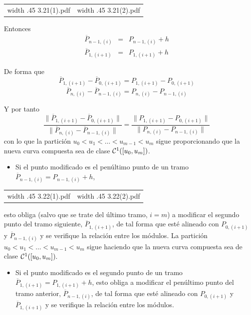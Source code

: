 \documentclass[twoside]{report}
\newcommand{\colocapdf}[2]{\quad\pdfimage width #2 {#1.pdf}}
\begin{document}
\begin{center}
\begin{tabular}{cc}
\colocapdf{3.21(1)}{.45\textwidth} &
\colocapdf{3.21(2)}{.45\textwidth}
\end{tabular}
\end{center}


Entonces $$\begin{array}{rcl} \overline{P}_{n-1, (i)}&=&P_{n-1, (i)}+h\\ \overline{P}_{1, (i+1)}&=&P_{1, (i+1)}+h \end{array}$$

De forma que
$$\overline{P}_{1, (i+1)}-\overline{P}_{0, (i+1)}=P_{1, (i+1)}-P_{0, (i+1)}$$
$$\overline{P}_{n, (i)}-\overline{P}_{n-1, (i)}=P_{n, (i)}-P_{n-1, (i)}$$

Y por tanto
$$\frac{\parallel \overline{P}_{1,(i+1)}-\overline{P}_{0,(i+1)}\parallel}{\parallel \overline{P}_{n, (i)}-\overline{P}_{n-1,(i)} \parallel}=\frac{\parallel P_{1,(i+1)}-P_{0,(i+1)}\parallel}{\parallel P_{n, (i)}-P_{n-1,(i)} \parallel}$$
con lo que la partici\'{o}n $u_0<u_1<\ldots<u_{m-1}<u_m$ sigue proporcionando que la nueva curva compuesta sea de clase ${\cal C}^1([u_0,u_m])$.

\begin{itemize}
\item Si el punto modificado es el pen\'{u}ltimo punto de un tramo $\overline{P}_{n-1,(i)}=P_{n-1,(i)}+h$,
\end{itemize}

\begin{center}
\begin{tabular}{cc}
\colocapdf{3.22(1)}{.45\textwidth} &
\colocapdf{3.22(2)}{.45\textwidth}
\end{tabular}
\end{center}

esto obliga (salvo que se trate del \'{u}ltimo tramo, $i=m$) a modificar el segundo punto del tramo siguiente, $\overline{P}_{1,(i+1)}$, de tal forma que est\'{e} alineado con $P_{0,(i+1)}$ y $\overline{P}_{n-1,(i)}$  y se verifique la relaci\'{o}n entre los m\'{o}dulos.
La partici\'{o}n $u_0<u_1<\ldots<u_{m-1}<u_m$ sigue haciendo que la nueva curva compuesta sea de clase ${\cal C}^1([u_0,u_m]).$

\begin{itemize}
\item Si el punto modificado es el segundo punto de un tramo $\overline{P}_{1,(i+1)}=P_{1,(i+1)}+h$, esto obliga a modificar el pen\'{u}ltimo punto del tramo anterior, $\overline{P}_{n-1,(i)}$, de tal forma que est\'{e} alineado con $P_{0,(i+1)}$ y $\overline{P}_{1,(i+1)}$  y se verifique la relaci\'{o}n entre los m\'{o}dulos.
\end{itemize}
\end{document}

